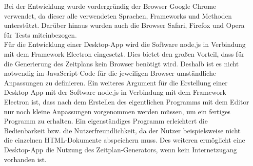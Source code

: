 Bei der Entwicklung wurde vordergründig der Browser Google Chrome verwendet, da dieser alle verwendeten Sprachen, Frameworks und Methoden unterstützt. Darüber hinaus wurden auch die Browser Safari, Firefox und Opera für Tests miteinbezogen.\\
Für die Entwicklung einer Desktop-App wird die Software node.js in Verbindung mit dem Framework Electron eingesetzt. Dies bietet den großen Vorteil, dass für die Generierung des Zeitplans kein Browser benötigt wird. Deshalb ist es nicht notwendig  im JavaScript-Code für die jeweiligen Browser umständliche Anpassungen zu definieren. Ein weiteres Argument für die Erstellung einer Desktop-App mit der Software node.js in Verbindung mit dem Framework Electron ist, dass nach dem Erstellen des eigentlichen Programms mit dem Editor nur noch kleine Anpassungen vorgenommen werden müssen, um ein fertiges Programm zu erhalten. Ein eigenständiges Programm erleichtert die Bedienbarkeit bzw. die Nutzerfreundlichkeit, da der Nutzer beispielsweise nicht die einzelnen HTML-Dokumente abspeichern muss. Des weiteren ermöglicht eine Desktop-App die Nutzung des Zeitplan-Generators, wenn kein Internetzugang vorhanden ist. \\
